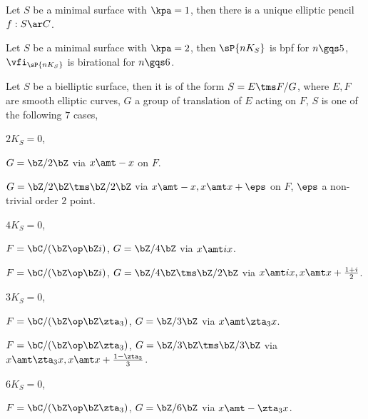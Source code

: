 \documentclass[article, a4paper, twoside]{universal}
\begin{document}
\begin{thm}
	Let $S$ be a minimal surface with $\kpa=1$, then there is a unique elliptic pencil $f:S\ar C$.
\end{thm}


\begin{thm}
	Let $S$ be a minimal surface with $\kpa=2$, then $\sP{nK_{S}}$ is bpf for $n\gqs5$, $\vfi_{\sP{nK_{S}}}$ is birational for $n\gqs6$.
\end{thm}



\begin{thm}
	Let $S$ be a bielliptic surface, then it is of the form $S=E\tms F/G$, where $E,F$ are smooth elliptic curves, $G$ a group of translation of $E$ acting on $F$, $S$ is one of the following $7$ cases,
	\begin{enr}[label=(\arabic*)]
		\item $2K_{S}=0$,
		\begin{itm}
			\item $G=\bZ/2\bZ$ via $x\amt-x$ on $F$.
			\item $G=\bZ/2\bZ\tms\bZ/2\bZ$ via $x\amt-x, x\amt x+\eps$ on $F$, $\eps$ a non-trivial order $2$ point.
		\end{itm}
		\item $4K_{S}=0$,
		\begin{itm}
			\item $F=\bC/(\bZ\op\bZ i)$, $G=\bZ/4\bZ$ via $x\amt ix$.
			\item $F=\bC/(\bZ\op\bZ i)$, $G=\bZ/4\bZ\tms\bZ/2\bZ$ via $x\amt ix, x\amt x+\frac{1+i}{2}$.
		\end{itm}
		\item $3K_{S}=0$,
		\begin{itm}
			\item $F=\bC/(\bZ\op\bZ\zta_{3})$, $G=\bZ/3\bZ$ via $x\amt \zta_{3}x$.
			\item $F=\bC/(\bZ\op\bZ\zta_{3})$, $G=\bZ/3\bZ\tms\bZ/3\bZ$ via $x\amt \zta_{3}x, x\amt x+\frac{1-\zta_{3}}{3}$.
		\end{itm}
		\item $6K_{S}=0$,
		\begin{itm}
			\item $F=\bC/(\bZ\op\bZ\zta_{3})$, $G=\bZ/6\bZ$ via $x\amt -\zta_{3}x$.
		\end{itm}
	\end{enr}
\end{thm}
\end{document}
